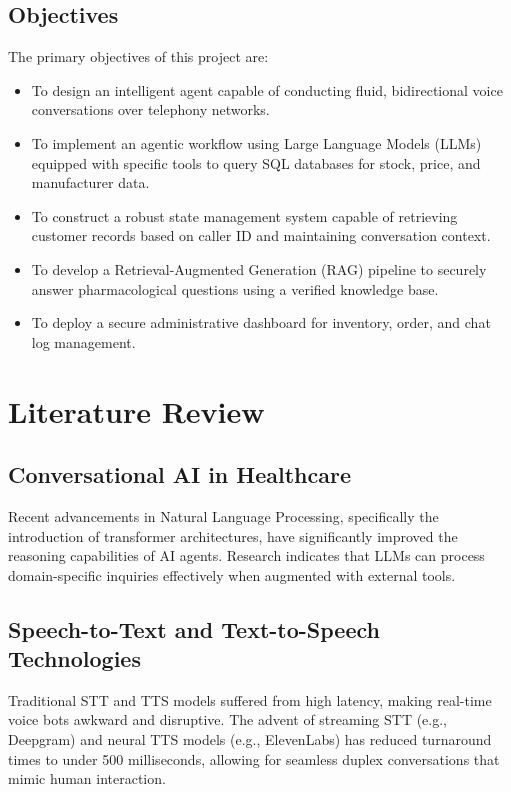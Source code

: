 \documentclass[12pt,a4paper]{report}
\begin{document}
\section{Objectives}
The primary objectives of this project are:
\begin{itemize}
    \item To design an intelligent agent capable of conducting fluid, bidirectional voice conversations over telephony networks.
    \item To implement an agentic workflow using Large Language Models (LLMs) equipped with specific tools to query SQL databases for stock, price, and manufacturer data.
    \item To construct a robust state management system capable of retrieving customer records based on caller ID and maintaining conversation context.
    \item To develop a Retrieval-Augmented Generation (RAG) pipeline to securely answer pharmacological questions using a verified knowledge base.
    \item To deploy a secure administrative dashboard for inventory, order, and chat log management.
\end{itemize}

\chapter{Literature Review}

\section{Conversational AI in Healthcare}
Recent advancements in Natural Language Processing, specifically the introduction of transformer architectures, have significantly improved the reasoning capabilities of AI agents. Research indicates that LLMs can process domain-specific inquiries effectively when augmented with external tools. 

\section{Speech-to-Text and Text-to-Speech Technologies}
Traditional STT and TTS models suffered from high latency, making real-time voice bots awkward and disruptive. The advent of streaming STT (e.g., Deepgram) and neural TTS models (e.g., ElevenLabs) has reduced turnaround times to under 500 milliseconds, allowing for seamless duplex conversations that mimic human interaction.
\end{document}

